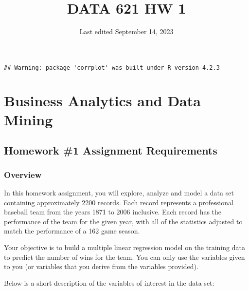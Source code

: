 \documentclass[
]{article}
\title{DATA 621 HW 1}
\author{}
\date{\vspace{-2.5em}Last edited September 14, 2023}
\begin{document}
\maketitle

\begin{verbatim}
## Warning: package 'corrplot' was built under R version 4.2.3
\end{verbatim}

\hypertarget{business-analytics-and-data-mining}{%
\section{\texorpdfstring{\textbf{Business Analytics and Data
Mining}}{Business Analytics and Data Mining}}\label{business-analytics-and-data-mining}}

\hypertarget{homework-1-assignment-requirements}{%
\subsection{Homework \#1 Assignment
Requirements}\label{homework-1-assignment-requirements}}

\hypertarget{overview}{%
\subsubsection{\texorpdfstring{\textbf{Overview}}{Overview}}\label{overview}}

In this homework assignment, you will explore, analyze and model a data
set containing approximately 2200 records. Each record represents a
professional baseball team from the years 1871 to 2006 inclusive. Each
record has the performance of the team for the given year, with all of
the statistics adjusted to match the performance of a 162 game season.

Your objective is to build a multiple linear regression model on the
training data to predict the number of wins for the team. You can only
use the variables given to you (or variables that you derive from the
variables provided).

Below is a short description of the variables of interest in the data
set:
\end{document}
